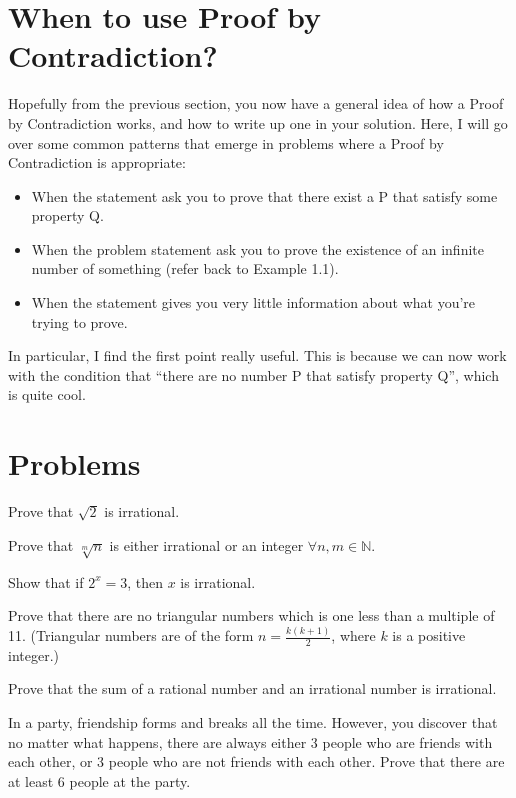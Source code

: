 \documentclass{article}
\theoremstyle{mytheoremstyle}
\theoremstyle{mytheoremstyle}
\theoremstyle{myproblemstyle}
\theoremstyle{myproblemstyle}
\begin{document}
    \clearpage

    \section{When to use Proof by Contradiction?}
        Hopefully from the previous section, you now have a general idea of how a Proof by Contradiction works, and how to write up one in your solution. Here, I will go over some common patterns that emerge in problems where a Proof by Contradiction is appropriate: 
        \begin{itemize}
            \item When the statement ask you to prove that there exist a P that satisfy some property Q.
            \item When the problem statement ask you to prove the existence of an infinite number of something (refer back to Example 1.1).
            \item When the statement gives you very little information about what you're trying to prove.
        \end{itemize}

        In particular, I find the first point really useful. This is because we can now work with the condition that ``there are no number P that satisfy property Q'', which is quite cool.
    \section{Problems}
    \bigskip

    \begin{problem}
        Prove that $\sqrt{2}$ is irrational.
    \end{problem}

    \begin{problem}
        Prove that $\sqrt[m]{n}$ is either irrational or an integer $\forall n, m \in \mathbb{N}$.
    \end{problem}

    \begin{problem}
        Show that if $2^x = 3$, then $x$ is irrational.
    \end{problem}

    \begin{problem}
        Prove that there are no triangular numbers which is one less than a multiple of 11. (Triangular numbers are of the form $n = \frac{k(k+1)}{2}$, where $k$ is a positive integer.)
    \end{problem}

    \begin{problem}
        Prove that the sum of a rational number and an irrational number is irrational.
    \end{problem}

    \begin{problem}
        In a party, friendship forms and breaks all the time. However, you discover that no matter what happens, there are always either 3 people who are friends with each other, or 3 people who are not friends with each other. Prove that there are at least 6 people at the party.
    \end{problem}
\end{document}
